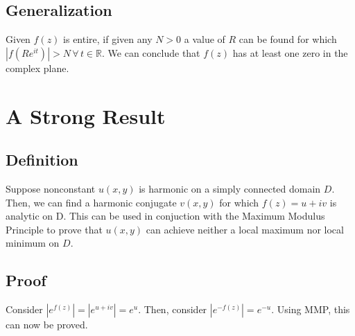\documentclass[../main.tex]{subfiles}
\begin{document}
    \subsection{Generalization}
        Given $f(z)$ is entire, if given any $N > 0$ a value of $R$ can be found for which $|f(Re^{it})|>N\,\forall\, t\in\mathbb{R}$.
        We can conclude that $f(z)$ has at least one zero in the complex plane.

\section{A Strong Result}
    \subsection{Definition}
    Suppose nonconstant $u(x,y)$ is harmonic on a simply connected domain $D$. Then, we can find a harmonic conjugate $v(x,y)$
    for which $f(z)=u+iv$ is analytic on D. This can be used in conjuction with the Maximum Modulus Principle to prove
    that $u(x,y)$ can achieve neither a local maximum nor local minimum on $D$.
    \subsection{Proof}
        Consider $|e^{f(z)}|=|e^{u+iv}|=e^{u}$. Then, consider $|e^{-f(z)}|=e^{-u}$. Using MMP, this can now be proved.
\end{document}
